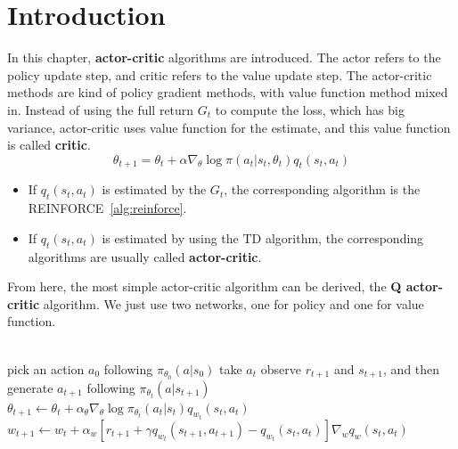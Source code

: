 \section{Introduction}
    In this chapter, \textbf{actor-critic} algorithms are introduced. The actor refers to the policy
    update step, and critic refers to the value update step. The actor-critic methods are kind of policy gradient methods,
    with value function method mixed in. Instead of using the full return $G_t$ to compute the loss, which has big variance,
    actor-critic uses value function for the estimate, and this value function is called \textbf{critic}.
    \begin{equation}
        \theta_{t+1} = \theta_t + \alpha \nabla_\theta \log{\pi(a_t|s_t,\theta_t)q_t(s_t,a_t)}
    \end{equation}
    \begin{itemize}
        \item If $q_t(s_t,a_t)$ is estimated by the $G_t$, the corresponding algorithm is the REINFORCE~\ref{alg:reinforce}.
        \item If $q_t(s_t,a_t)$ is estimated by using the TD algorithm, the corresponding algorithms are usually called \textbf{actor-critic}.
    \end{itemize}

    From here, the most simple actor-critic algorithm can be derived, the \textbf{Q actor-critic} algorithm.
    We just use two networks, one for policy and one for value function.
    
    {
         \\
    }
    {
    }
    {
        pick an action $a_0$ following $\pi_{\theta_0}(a|s_0)$\;
        {
            take $a_t$\;
            observe $r_{t+1}$ and $s_{t+1}$, and then generate $a_{t+1}$ following $\pi_{\theta_t}(a|s_{t+1})$\;
            $\theta_{t+1} \leftarrow \theta_t + \alpha_\theta \nabla_\theta \log{\pi_{\theta_t}(a_t|s_t)}q_{w_t}(s_t,a_t)$\;
            $w_{t+1} \leftarrow w_t + \alpha_w[r_{t+1} + \gamma q_{w_t}(s_{t+1},a_{t+1}) - q_{w_t}(s_t,a_t)]\nabla_w q_w(s_t,a_t)$\;
        }
        \Return{$\pi$}
    }
